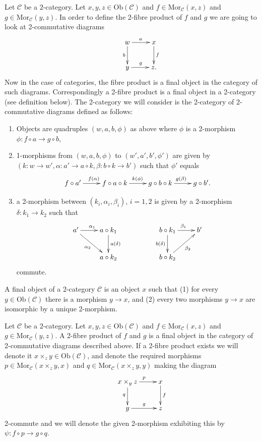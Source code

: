 \smallskip\noindent
Let $\mathcal{C}$ be a $2$-category. Let $x,y,z\in \text{Ob}(\mathcal{C})$ and
$f\in \text{Mor}_{\mathcal{C}}(x,z)$ and $g\in \text{Mor}_{\mathcal C}(y,z)$.
In order to define the 2-fibre product of $f$ and $g$ we are going to look at
2-commutative diagrams
$$
\xymatrix{
&w \ar[r]^{a} \ar[d]_{b} & x \ar[d]^{f} \\
&y \ar[r]^{g} & z. }
$$
Now in the case of categories, the fibre product is a final object in the
category of such diagrams. Correspondingly a 2-fibre product is a final object
in a 2-category (see definition below). The 2-category we will consider is
the 2-category of 2-commutative diagrams defined as follows:
\begin{enumerate}
\item Objects are quadruples $(w,a,b,\phi)$ as above where $\phi$
is a 2-morphism $\phi : f \circ a \to g \circ b$, 
\item 1-morphisms from $(w,a,b,\phi)$ to $(w',a',b',\phi')$
are given by $(k : w \to w', \alpha : a' \to a \circ k,
\beta : b \circ k \to b')$ such that $\phi'$ equals 
$$
\xymatrix{
f \circ a' \ar[r]^{f(\alpha)} &
f \circ a \circ k \ar[r]^{k(\phi)} &
g \circ b \circ k \ar[r]^{g(\beta)} &
g \circ b'. }
$$
\item a 2-morphism between $(k_i, \alpha_i, \beta_i)$, $i=1,2$ is given
by a 2-morphism $\delta : k_1 \to k_2$ such that 
$$
\xymatrix{
a' \ar[rd]_{\alpha_2} \ar[r]^{\alpha_1} & 
a \circ k_1 \ar[d]^{a(\delta)} &
&
b \circ k_1 \ar[r]^{\beta_1} \ar[d]_{b(\delta)} &
b'
\\
&
a \circ k_2 &
&
b \circ k_2 \ar[ru]_{\beta_2}
&
}
$$
commute.
\end{enumerate}

\begin{definition}
\label{definition-final-object-2-category}
A final object of a 2-category $\mathcal{C}$ is an object $x$ such that
(1) for every $y \in \text{Ob}(\mathcal{C})$ there is a morphism $y \to x$,
and (2) every two morphisms $y \to x$ are isomorphic by a unique 2-morphism.
\end{definition}

\begin{definition}
\label{definition-2-fibre-products}
Let $\mathcal{C}$ be a $2$-category.
Let $x,y,z\in \text{Ob}(\mathcal{C})$ and $f\in \text{Mor}_{\mathcal{C}}(x,z)$
and $g\in \text{Mor}_{\mathcal C}(y,z)$. A 2-fibre product of $f$ and $g$ is
a final object in the category of 2-commutative diagrams described above. If
a 2-fibre product exists we
will denote it $x\times_z y\in \text{Ob}(\mathcal{C})$, and denote the
required morphisms $p\in \text{Mor}_{\mathcal C}(x\times_z y,x)$ and 
$q\in \text{Mor}_{\mathcal C}(x\times_z y,y)$ making the diagram
$$
\xymatrix{
&x\times_y z \ar[r]^{p} \ar[d]_{q} & x \ar[d]^{f} \\
&y \ar[r]^{g} & z }
$$
2-commute and we will denote the given 2-morphism exhibiting this by
$\psi : f \circ p \to g \circ q$.
\end{definition}

